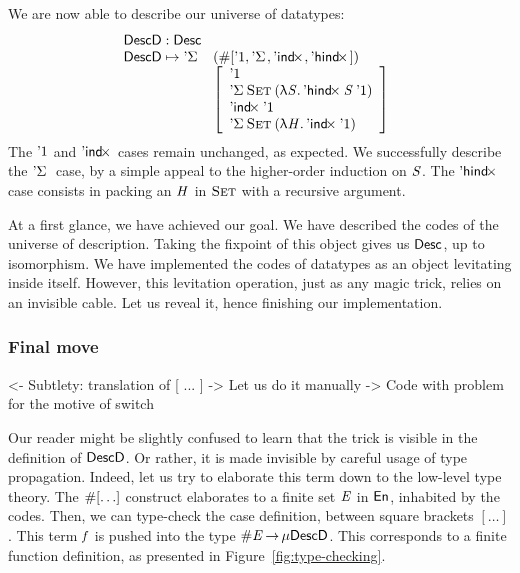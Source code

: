 We are now able to describe our universe of datatypes:
%
\[\stk{
\DescD : \Desc \\
\begin{array}{@{}ll}
\DescD \mapsto \DSigma{\!}{\!} & (\EnumT{[ \DUnit, \DSigma{\!}{\!}, \DIndx{\!}, \DHindx{\!}{\!} ]}) \\
                           & \left[\begin{array}{l}
                                   \DUnit                                            \\
                                   \DSigma{\Set}{(\LAM{\V{S}} \DHindx{\V{S}}{\DUnit})}   \\
                                   \DIndx{\DUnit}                                    \\
                                   \DSigma{\Set}{(\LAM{\V{H}} \DIndx{\DUnit})}
                                   \end{array}
                             \right]
\end{array}
}\]
%
The $\DUnit$ and $\DIndx{\!}$ cases remain unchanged, as expected. We
successfully describe the $\DSigma{\!}{}$ case, by a simple appeal to
the higher-order induction on $\V{S}$. The $\DHindx{\!}{\!}$ case
consists in packing an $\V{H}$ in $\Set$ with a recursive argument.

At a first glance, we have achieved our goal. We have described the
codes of the universe of description. Taking the fixpoint of this
object gives us $\Desc$, up to isomorphism. We have implemented the
codes of datatypes as an object levitating inside itself. However,
this levitation operation, just as any magic trick, relies on an
invisible cable. Let us reveal it, hence finishing our implementation.


\subsubsection{Final move}

\begin{wstructure}
<- Subtlety: translation of [ ... ]
    -> Let us do it manually
        -> Code with problem for the motive of switch
\end{wstructure}


Our reader might be slightly confused to learn that the trick is
visible in the definition of $\DescD$. Or rather, it is made invisible
by careful usage of type propagation. Indeed, let us try to elaborate
this term down to the low-level type theory. The $\EnumT{[ \ldots ]}$
construct elaborates to a finite set $\V{E}$ in $\EnumU$, inhabited by
the codes. Then, we can type-check the case definition, between square
brackets $[ \ldots ]$. This term $\V{f}$ is pushed into the type
$\EnumT{\V{E}} \To \Mu{\DescD}$. This corresponds to a finite function
definition, as presented in Figure~\ref{fig:type-checking}.


